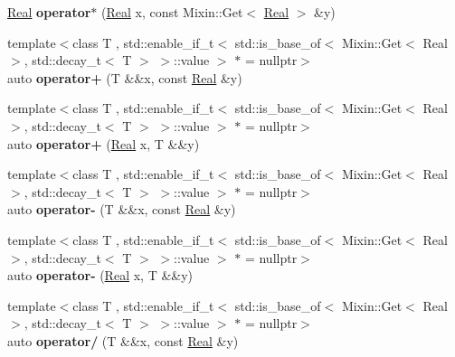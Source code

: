 \begin{DoxyCompactItemize}
\item 
\hypertarget{namespaceSpacy_af0d849d3130fd1252cf3a58b4f194e6b}{\hyperlink{classSpacy_1_1Real}{\-Real} {\bfseries operator$\ast$} (\hyperlink{classSpacy_1_1Real}{\-Real} x, const \-Mixin\-::\-Get$<$ \hyperlink{classSpacy_1_1Real}{\-Real} $>$ \&y)}\label{namespaceSpacy_af0d849d3130fd1252cf3a58b4f194e6b}

\item 
\hypertarget{namespaceSpacy_a00adbd58a88f8474c28da323effbcc26}{{\footnotesize template$<$class T , std\-::enable\-\_\-if\-\_\-t$<$ std\-::is\-\_\-base\-\_\-of$<$ Mixin\-::\-Get$<$ Real $>$, std\-::decay\-\_\-t$<$ T $>$ $>$\-::value $>$ $\ast$  = nullptr$>$ }\\auto {\bfseries operator+} (\-T \&\&x, const \hyperlink{classSpacy_1_1Real}{\-Real} \&y)}\label{namespaceSpacy_a00adbd58a88f8474c28da323effbcc26}

\item 
\hypertarget{namespaceSpacy_af24641d6a51293d3601c760ec310a1b1}{{\footnotesize template$<$class T , std\-::enable\-\_\-if\-\_\-t$<$ std\-::is\-\_\-base\-\_\-of$<$ Mixin\-::\-Get$<$ Real $>$, std\-::decay\-\_\-t$<$ T $>$ $>$\-::value $>$ $\ast$  = nullptr$>$ }\\auto {\bfseries operator+} (\hyperlink{classSpacy_1_1Real}{\-Real} x, \-T \&\&y)}\label{namespaceSpacy_af24641d6a51293d3601c760ec310a1b1}

\item 
\hypertarget{namespaceSpacy_a0ce5976cd9ab32a6eecaa92fc3ea803a}{{\footnotesize template$<$class T , std\-::enable\-\_\-if\-\_\-t$<$ std\-::is\-\_\-base\-\_\-of$<$ Mixin\-::\-Get$<$ Real $>$, std\-::decay\-\_\-t$<$ T $>$ $>$\-::value $>$ $\ast$  = nullptr$>$ }\\auto {\bfseries operator-\/} (\-T \&\&x, const \hyperlink{classSpacy_1_1Real}{\-Real} \&y)}\label{namespaceSpacy_a0ce5976cd9ab32a6eecaa92fc3ea803a}

\item 
\hypertarget{namespaceSpacy_a92fe6ff3c620feb4c8299e6ac3959a42}{{\footnotesize template$<$class T , std\-::enable\-\_\-if\-\_\-t$<$ std\-::is\-\_\-base\-\_\-of$<$ Mixin\-::\-Get$<$ Real $>$, std\-::decay\-\_\-t$<$ T $>$ $>$\-::value $>$ $\ast$  = nullptr$>$ }\\auto {\bfseries operator-\/} (\hyperlink{classSpacy_1_1Real}{\-Real} x, \-T \&\&y)}\label{namespaceSpacy_a92fe6ff3c620feb4c8299e6ac3959a42}

\item 
\hypertarget{namespaceSpacy_aeec0910b94a07ae8dfe79f971ea8425a}{{\footnotesize template$<$class T , std\-::enable\-\_\-if\-\_\-t$<$ std\-::is\-\_\-base\-\_\-of$<$ Mixin\-::\-Get$<$ Real $>$, std\-::decay\-\_\-t$<$ T $>$ $>$\-::value $>$ $\ast$  = nullptr$>$ }\\auto {\bfseries operator/} (\-T \&\&x, const \hyperlink{classSpacy_1_1Real}{\-Real} \&y)}\label{namespaceSpacy_aeec0910b94a07ae8dfe79f971ea8425a}


\end{DoxyCompactItemize}

